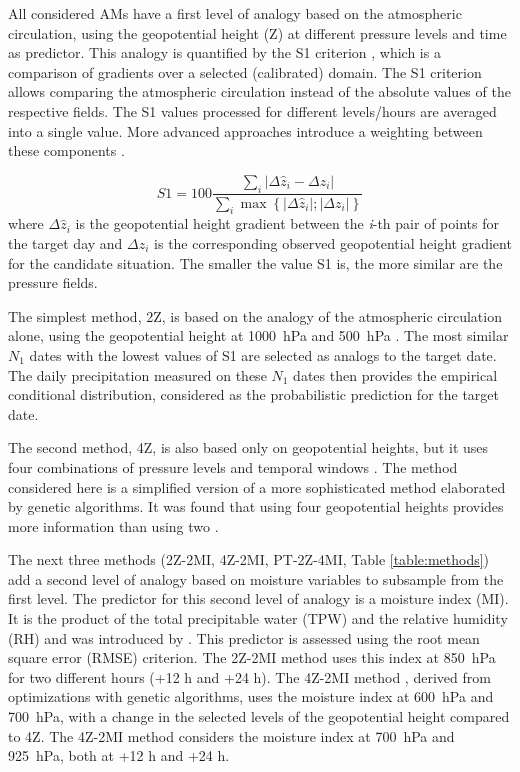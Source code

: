 \documentclass[alpha-refs]{wiley-article}
\begin{document}
All considered AMs have a first level of analogy based on the atmospheric circulation, using the geopotential height (Z) at different pressure levels and time as predictor. This analogy is quantified by the S1 criterion \citep[Eq.\ \ref{eq:S1}, ][]{Teweles1954, Brown2012}, which is a comparison of gradients over a selected (calibrated) domain. The S1 criterion allows comparing the atmospheric circulation instead of the absolute values of the respective fields. The S1 values processed for different levels/hours are averaged into a single value. More advanced approaches introduce a weighting between these components \citep{Horton2017a}.

\begin{equation}
	\label{eq:S1}
	S1=100 \frac{\sum_{i} \vert \Delta\hat{z}_{i} - \Delta z_{i} \vert}{\sum_{i} \max\left\lbrace \vert \Delta\hat{z}_{i} \vert; \vert \Delta z_{i} \vert \right\rbrace }
\end{equation}
where $\Delta \hat{z}_{i}$ is the geopotential height gradient between the \textit{i}-th pair of points for the target day and $\Delta z_{i}$ is the corresponding observed geopotential height gradient for the candidate situation. The smaller the value S1 is, the more similar are the pressure fields.

The simplest method, 2Z, is based on the analogy of the atmospheric circulation alone, using the geopotential height at 1000~hPa and 500~hPa \citep{Bontron2004}. The most similar $N_{1}$ dates with the lowest values of S1 are selected as analogs to the target date. The daily precipitation measured on these $N_{1}$ dates then provides the empirical conditional distribution, considered as the probabilistic prediction for the target date.

The second method, 4Z, is also based only on geopotential heights, but it uses four combinations of pressure levels and temporal windows \citep{Horton2018a}. The method considered here is a simplified version of a more sophisticated method elaborated by genetic algorithms. It was found that using four geopotential heights provides more information than using two \citep{Horton2018a}.

The next three methods (2Z-2MI, 4Z-2MI, PT-2Z-4MI, Table \ref{table:methods}) add a second level of analogy based on moisture variables to subsample from the first level. The predictor for this second level of analogy is a moisture index (MI). It is the product of the total precipitable water (TPW) and the relative humidity (RH) and was introduced by \citet{Bontron2004}. This predictor is assessed using the root mean square error (RMSE) criterion. The 2Z-2MI method \citep{Bontron2004} uses this index at 850~hPa for two different hours (+12 h and +24 h). The 4Z-2MI method \citep{Horton2018a}, derived from optimizations with genetic algorithms, uses the moisture index at 600~hPa and 700~hPa, with a change in the selected levels of the geopotential height compared to 4Z. The 4Z-2MI method \citep{BenDaoud2016} considers the moisture index at 700~hPa and 925~hPa, both at +12 h and +24 h.
\end{document}
